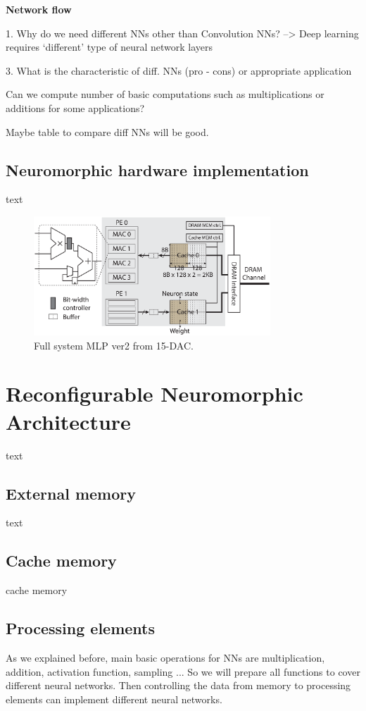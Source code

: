 \documentclass[pageno]{jpaper}
\begin{document}
\textbf{Network flow}







1. Why do we need different NNs other than Convolution NNs? --> Deep learning requires `different' type of neural network layers


3. What is the characteristic of diff. NNs (pro - cons) or appropriate application

Can we compute number of basic computations such as multiplications or additions for some applications? 

Maybe table to compare diff NNs will be good.
\subsection{Neuromorphic hardware implementation}\label{sub_sec:Previous works hardware}
text

\begin{figure}[!t]
\centering
\includegraphics[width=3.5in]{fig/Full_system_MLP_ver2.eps}
\caption{Full system MLP ver2 from 15-DAC.}
\label{fig:MLP_system}
\end{figure}


\section{Reconfigurable Neuromorphic Architecture}\label{sec:architecture}
text
\subsection{External memory}\label{sub_sec:ext_mem}
text
\subsection{Cache memory}\label{sub_sec:cache_mem}
cache memory

\subsection{Processing elements}\label{sub_sec:pe}
As we explained before, main basic operations for NNs are multiplication, addition, activation function, sampling ... So we will prepare all functions to cover different neural networks. Then controlling the data from memory to processing elements can implement different neural networks.
\end{document}
